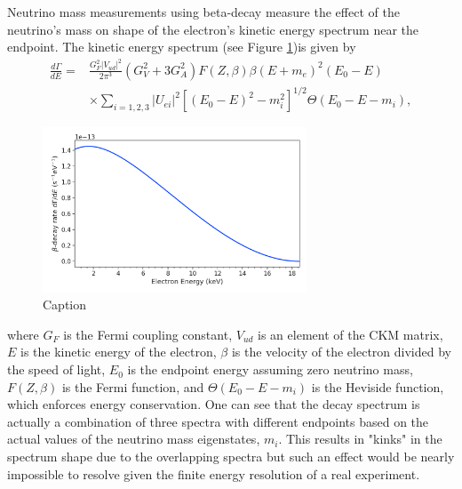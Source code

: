 Neutrino mass measurements using beta-decay measure the effect of the neutrino's mass on shape of the electron's kinetic energy spectrum near the endpoint. The kinetic energy spectrum (see Figure \ref{fig:chap2-tritium-spectrum})is given by 
\begin{equation}
\begin{split}
    \frac{d\Gamma}{dE}=&\frac{G_F^2|V_{ud}|^2}{2\pi^3}(G_V^2+3G_A^2)F(Z,\beta)\beta(E+m_e)^2(E_0-E)\\
    &\times \sum_{i=1,2,3}{|U_{ei}|^2[(E_0-E)^2-m_i^2]^{1/2}\Theta(E_0-E-m_i)},
\end{split}
\end{equation}
\begin{figure}[htbp]
    \centering
    \includegraphics[width=0.7\textwidth]{figs/Chapter-2/230302_atomic_tritium_spectrum.png}
    \caption{Caption}
    \label{fig:chap2-tritium-spectrum}
\end{figure}
where $G_F$ is the Fermi coupling constant, $V_{ud}$ is an element of the CKM matrix, $E$ is the kinetic energy of the electron, $\beta$ is the velocity of the electron divided by the speed of light, $E_0$ is the endpoint energy assuming zero neutrino mass, $F(Z,\beta)$ is the Fermi function, and $\Theta(E_0-E-m_i)$ is the Heviside function, which enforces energy conservation. One can see that the decay spectrum is actually a combination of three spectra with different endpoints based on the actual values of the neutrino mass eigenstates, $m_i$. This results in "kinks" in the spectrum shape due to the overlapping spectra but such an effect would be nearly impossible to resolve given the finite energy resolution of a real experiment. 

